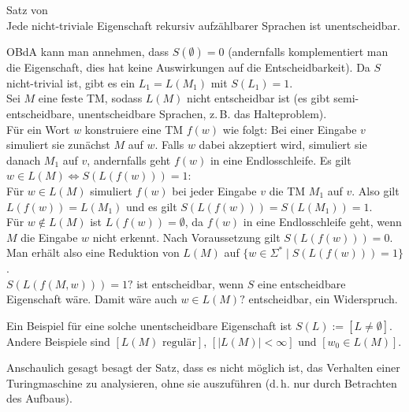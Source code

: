 \begin{Satz}{Satz von \upshape\,\!}\\
    Jede nicht-triviale Eigenschaft rekursiv aufzählbarer Sprachen ist unentscheidbar.
\end{Satz}

\begin{Beweis}
    OBdA kann man annehmen, dass $S(\emptyset) = 0$
    (andernfalls komplementiert man die Eigenschaft, dies hat keine Auswirkungen auf die
    Entscheidbarkeit).
    Da $S$ nicht-trivial ist, gibt es ein $L_1 = L(M_1)$ mit $S(L_1) = 1$.\\
    Sei $M$ eine feste TM, sodass $L(M)$ nicht entscheidbar ist
    (es gibt semi-entscheidbare, unentscheidbare Sprachen, z.\,B. das Halteproblem).\\
    Für ein Wort $w$ konstruiere eine TM $f(w)$ wie folgt:
    Bei einer Eingabe $v$ simuliert sie zunächst $M$ auf $w$.
    Falls $w$ dabei akzeptiert wird, simuliert sie danach $M_1$ auf $v$,
    andernfalls geht $f(w)$ in eine Endlosschleife.
    Es gilt $w \in L(M) \iff S(L(f(w))) = 1$:\\
    Für $w \in L(M)$ simuliert $f(w)$ bei jeder Eingabe $v$ die TM $M_1$ auf $v$.
    Also gilt $L(f(w)) = L(M_1)$ und es gilt $S(L(f(w))) = S(L(M_1)) = 1$.\\
    Für $w \notin L(M)$ ist $L(f(w)) = \emptyset$, da $f(w)$ in eine Endlosschleife geht,
    wenn $M$ die Eingabe $w$ nicht erkennt.
    Nach Voraussetzung gilt $S(L(f(w))) = 0$.\\
    Man erhält also eine Reduktion von $L(M)$ auf
    $\{w \in \Sigma^\ast \;|\; S(L(f(w))) = 1\}$.\\
    $S(L(f(M, w))) = 1?$ ist entscheidbar,
    wenn $S$ eine entscheidbare Eigenschaft wäre.
    Damit wäre auch $w \in L(M)?$ entscheidbar, ein Widerspruch.
\end{Beweis}

\begin{Bsp}
    Ein Beispiel für eine solche unentscheidbare Eigenschaft ist
    $S(L) := [L \not= \emptyset]$.\\
    Andere Beispiele sind $[L(M) \text{ regulär}]$, $[|L(M)| < \infty]$ und $[w_0 \in L(M)]$.
\end{Bsp}

\begin{Bem}
    Anschaulich gesagt besagt der Satz, dass es nicht möglich ist, das Verhalten einer
    Turingmaschine zu analysieren, ohne sie auszuführen (d.\,h. nur durch Betrachten des Aufbaus).
\end{Bem}

